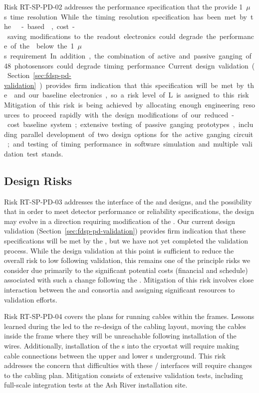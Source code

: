 Risk RT-SP-PD-02 addresses the performance specification that the  provide \SI{1}{$\mu$s} time resolution.  While the timing resolution specification has been met by the  -based ,  cost-saving modifications to the readout electronics could degrade the performance of the  below the \SI{1}{$\mu$s} requirement.  In addition, the combination of active and passive ganging of 48 photosensors could degrade timing performance.  Current design validation (Section~\ref{sec:fdsp-pd-validation}) provides firm indication that this specification will be met by the  and our baseline electronics, so a risk level of L is assigned to this risk.  Mitigation of this risk is being achieved by allocating enough engineering resources to proceed rapidly with the design modifications of our reduced-cost baseline system; extensive testing of passive ganging prototypes, including parallel development of two design options for the active ganging circuit; and testing of timing performance in software simulation and multiple validation test stands.


\subsection{Design Risks}

Risk RT-SP-PD-03 addresses the interface of the  and  designs, and the possibility that in order to meet detector performance or reliability specifications, the  design may evolve in a direction requiring modification of the .  Our current design validation (Section~\ref{sec:fdsp-pd-validation}) provides firm indication that these specifications will be met by the , but we have not yet completed the validation process.  While the design validation at this point is sufficient to reduce the overall risk to low following validation, this remains one of the principle risks we consider due primarily to the significant potential costs (financial and schedule) associated with such a change following the .  Mitigation of this risk involves close interaction between the  and  consortia and assigning significant resources to  validation efforts.

Risk RT-SP-PD-04 covers the plans for running  cables within the  frames.  Lessons learned during the  led to the re-design of the  cabling layout, moving the cables inside the  frame where they will be unreachable following installation of the  wires.  Additionally, installation of the s into the cryostat will require making  cable connections between the upper and lower s underground.  This risk addresses the concern that difficulties with these / interfaces will require changes to the cabling plan.  Mitigation consists of extensive validation tests, including full-scale integration tests at the Ash River installation site.

